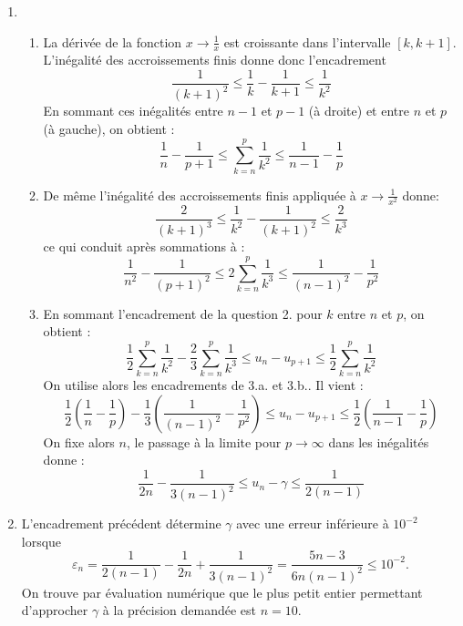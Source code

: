 \begin{enumerate}
\item \begin{enumerate}
 \item La dérivée de la fonction $x\rightarrow\frac{1}{x}$ est croissante dans l'intervalle $[k,k+1]$. L'inégalité des accroissements finis donne donc l'encadrement
\begin{displaymath}
 \frac{1}{(k+1)^2} \leq \frac{1}{k} - \frac{1}{k+1} \leq \frac{1}{k^2}
\end{displaymath}
En sommant ces inégalités entre $n-1$ et $p-1$ (à droite) et entre $n$ et $p$ (à gauche), on obtient :
\begin{displaymath}
 \frac{1}{n}-\frac{1}{p+1}\leq \sum_{k=n}^{p} \frac{1}{k^2} \leq \frac{1}{n-1}-\frac{1}{p}
\end{displaymath}
\item De même l'inégalité des accroissements finis appliquée à $x\rightarrow\frac{1}{x^2}$ donne:
\begin{displaymath}
 \frac{2}{(k+1)^3} \leq \frac{1}{k^2} - \frac{1}{(k+1)^2} \leq \frac{2}{k^3}
\end{displaymath}
ce qui conduit après sommations à :
\begin{displaymath}
 \frac{1}{n^2}-\frac{1}{(p+1)^2}\leq 2\sum_{k=n}^{p} \frac{1}{k^3} \leq \frac{1}{(n-1)^2}-\frac{1}{p^2}
\end{displaymath}
\item En sommant l'encadrement de la question 2. pour $k$ entre $n$ et $p$, on obtient :
\begin{displaymath}
 \frac{1}{2}\sum_{k=n}^{p} \frac{1}{k^2} - \frac{2}{3}\sum_{k=n}^{p} \frac{1}{k^3} \leq
u_n -u_{p+1} \leq 
\frac{1}{2}\sum_{k=n}^{p} \frac{1}{k^2}
\end{displaymath}
On utilise alors les encadrements de 3.a. et 3.b.. Il vient :
\begin{displaymath}
 \frac{1}{2}\left( \frac{1}{n} - \frac{1}{p}\right) -\frac{1}{3}\left( \frac{1}{(n-1)^2} - \frac{1}{p^2}\right) \leq 
u_n -u _{p+1} \leq
\frac{1}{2}\left( \frac{1}{n-1} - \frac{1}{p}\right)
\end{displaymath}
On fixe alors $n$, le passage à la limite pour $p\rightarrow \infty$ dans les inégalités donne :
\begin{displaymath}
 \frac{1}{2n} - \frac{1}{3(n-1)^2} \leq u_n -\gamma \leq \frac{1}{2(n-1)}
\end{displaymath}
\end{enumerate}
\item L'encadrement précédent détermine $\gamma$ avec une erreur inférieure à $10^{-2}$ lorsque
\begin{displaymath}
 \varepsilon_n = \frac{1}{2(n-1)} -\frac{1}{2n} + \frac{1}{3(n-1)^2} = \frac{5n-3}{6n(n-1)^2} \leq 10^{-2}.
\end{displaymath}
On trouve par évaluation numérique que le plus petit entier permettant d'approcher $\gamma$ à la précision demandée est $n=10$.
\end{enumerate}
